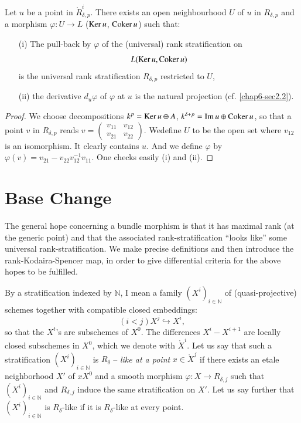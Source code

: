 \begin{subproposition}\label{chap6-prop2.3.1}
Let $u$ be a point in $\ring{R}^{i}_{\delta,p}$. There exists an open
neighbourhood $U$ of $u$ in $R_{\delta,p}$ and a morphism
$\varphi:U\to L$ ($\operatorname{Ker} u$, $\operatorname{Coker} u$) such that:
\begin{itemize}
\item[\rm(i)] The pull-back by $\varphi$ of the (universal) rank
stratification on 
$$
L(\operatorname{Ker} u, \operatorname{Coker} u)
$$
is the universal rank
stratification $R_{\delta,p}$ restricted to $U$,

\item[\rm(ii)] the derivative $d_{u}\varphi$ of $\varphi$ at $u$ is
the natural projection {\rm (cf. \ref{chap6-sec2.2}).}
\end{itemize}
\end{subproposition}

\begin{proof}
We choose decompositions $k^{p}=\operatorname{Ker} u\oplus A$,
$k^{\delta+p}=\text{Im\,}u\oplus \operatorname{Coker} u$, so that a point $v$ in
$R_{\delta,p}$ reads $v=\left(\begin{smallmatrix} v_{11} & v_{12}\\
v_{21} & v_{22}\end{smallmatrix}\right)$. We\pageoriginale define $U$
to be the open set where $v_{12}$ is an isomorphism. It clearly
contains $u$. And we define $\varphi$ by
$\varphi(v)=v_{21}-v_{22}v^{-1}_{12}v_{11}$. One checks easily (i) and (ii).
\end{proof}

\section{Base Change}\label{chap6-sec3}

The general hope concerning a bundle morphism is that it has maximal
rank (at the generic point) and that the associated
rank-stratification ``looks like'' some universal
rank-stratification. We make precise definitions and then introduce
the rank-Kodaira-Spencer map, in order to give differential criteria
for the above hopes to be fulfilled.

\begin{definition}\label{chap6-defi3.1}
By a stratification indexed by $\mathbb{N}$, I mean a family
$(X^{i})_{i\in \mathbb{N}}$ of (quasi-projective) schemes together
with compatible closed embeddings:
$$
(i<j)X^{j}\hookrightarrow X^{i},
$$
so that the $X^{t}$'s are subschemes of $X^{0}$. The differences
$X^{i}-X^{i+1}$ are locally closed subschemes in $X^{0}$, which we
denote with $\ring{X}^{i}$. Let us say that such a stratification
$(X^{i})_{i\in \mathbb{N}}$ is $R_{\delta}$ -- {\em like at a point}
$x\in \ring{X}^{j}$ if there exists an etale neighborhood $X'$ of
$xX^{0}$ and a smooth morphism $\varphi:X\to R_{\delta,j}$ such that
$(X^{i})_{i\in \mathbb{N}}$ and $R_{\delta,j}$ induce the same
stratification on $X'$. Let us say further that
$(X^{i})_{i\in \mathbb{N}}$ is $R_{\delta}$-like if it is
$R_{\delta}$-like at every point. 
\end{definition}

